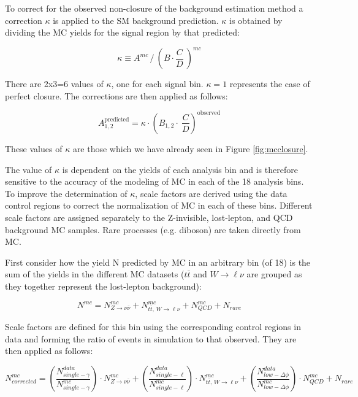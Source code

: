 To correct for the observed non-closure of the background estimation method a correction $\kappa$ is applied to the SM background prediction. $\kappa$ is obtained by dividing the MC yields for the signal region by that predicted:

\begin{equation}
\kappa  \equiv A^{mc} \,/  \ \left(B \cdot \frac{C} {D} \ \right)^{mc}
\label{eq:kappa}
\end{equation}

There are 2x3=6 values of $\kappa$, one for each signal bin. $\kappa=1$ represents the case of perfect closure. The corrections are then applied as follows:

\begin{equation}
A_{1, 2}^{\mathrm{predicted}} = \kappa \cdot \left(B_{1, 2} \cdot \ \frac{C}{D}\right)^{\textrm{observed}}
\end{equation}

These values of $\kappa$ are those which we have already seen in Figure \ref{fig:mcclosure}.

The value of $\kappa$ is dependent on the yields of each analysis bin and is therefore sensitive to the accuracy of the modeling of MC in each of the 18 analysis bins. To improve the determination of $\kappa$, scale factors are derived using the data control regions to correct the normalization of MC in each of these bins. Different scale factors are assigned separately to the Z-invisible, lost-lepton, and QCD background MC samples. Rare processes (e.g. diboson) are taken directly from MC.

First consider how the yield N predicted by MC in an arbitrary bin (of 18) is the sum of the yields in the different MC datasets ($t\bar{t}$ and $W\rightarrow\ell\nu$ are grouped as they together represent the lost-lepton background):

\begin{equation}
N^{mc} = N_{Z\rightarrow\nu\bar{\nu}}^{mc} + N_{t\bar{t},\,W\rightarrow\ell\nu}^{mc} + N_{QCD}^{mc} + N_{rare}
\end{equation}

Scale factors are defined for this bin using the corresponding control regions in data and forming the ratio of events in simulation to that observed. They are then applied as follows:

\begin{equation}
N_{corrected}^{mc} = \left(\frac{N_{single-\gamma}^{data}}{N_{single-\gamma}^{mc}}\right) \cdot N_{Z\rightarrow\nu\bar{\nu}}^{mc} + \left(\frac{N^{data}_{single-\ell}}{N^{mc}_{single-\ell}}\right) \cdot N^{mc}_{t\bar{t},\,W\rightarrow\ell\nu} + \left(\frac{N^{data}_{low-\Delta\phi}}{N^{mc}_{low-\Delta\phi}}\right) \cdot N_{QCD}^{mc} + N_{rare}
\end{equation}

